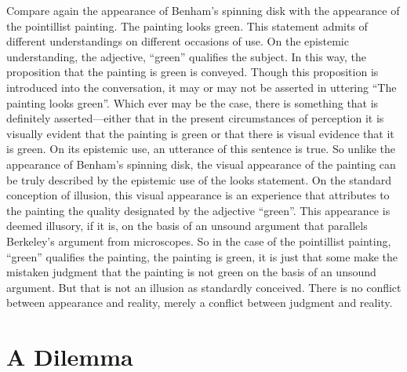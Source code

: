 \documentclass[12pt]{article}
\begin{document}
Compare again the appearance of Benham's spinning disk with the appearance of the pointillist painting. The painting looks green. This statement admits of different understandings on different occasions of use. On the epistemic understanding, the adjective, ``green'' qualifies the subject. In this way, the proposition that the painting is green is conveyed. Though this proposition is introduced into the conversation, it may or may not be asserted in uttering ``The painting looks green''. Which ever may be the case, there is something that is definitely asserted---either that in the present circumstances of perception it is visually evident that the painting is green or that there is visual evidence that it is green. On its epistemic use, an utterance of this sentence is true. So unlike the appearance of Benham's spinning disk, the visual appearance of the painting can be truly described by the epistemic use of the looks statement. On the standard conception of illusion, this visual appearance is an experience that attributes to the painting the quality designated by the adjective ``green''. This appearance is deemed illusory, if it is, on the basis of an unsound argument that parallels Berkeley's argument from microscopes. So in the case of the pointillist painting, ``green'' qualifies the painting, the painting is green, it is just that some make the mistaken judgment that the painting is not green on the basis of an unsound argument. But that is not an illusion as standardly conceived. There is no conflict between appearance and reality, merely a conflict between judgment and reality.


% 


\section{A Dilemma}\label{sec:a_dilemma} %
\end{document}
